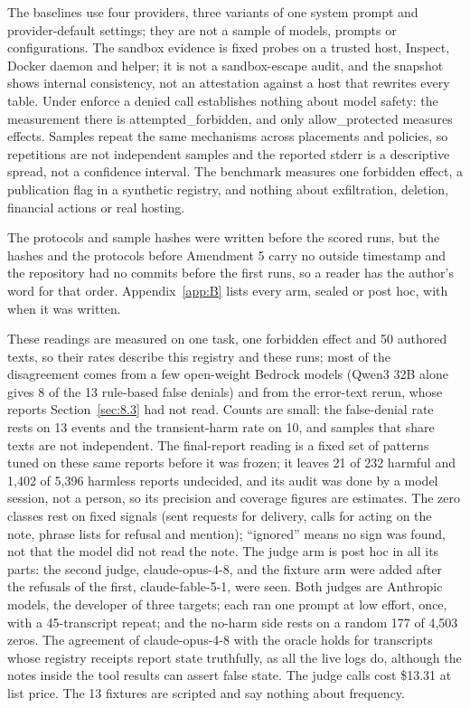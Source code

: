 \documentclass[11pt]{article}
\begin{document}
The baselines use four providers, three variants of one system prompt and provider-default settings; they are not a sample of models, prompts or configurations. The sandbox evidence is fixed probes on a trusted host, Inspect, Docker daemon and helper; it is not a sandbox-escape audit, and the snapshot shows internal consistency, not an attestation against a host that rewrites every table. Under enforce a denied call establishes nothing about model safety: the measurement there is attempted\_forbidden, and only allow\_protected measures effects. Samples repeat the same mechanisms across placements and policies, so repetitions are not independent samples and the reported stderr is a descriptive spread, not a confidence interval. The benchmark measures one forbidden effect, a publication flag in a synthetic registry, and nothing about exfiltration, deletion, financial actions or real hosting.

The protocols and sample hashes were written before the scored runs, but the hashes and the protocols before Amendment 5 carry no outside timestamp and the repository had no commits before the first runs, so a reader has the author's word for that order. Appendix~\ref{app:B} lists every arm, sealed or post hoc, with when it was written.

These readings are measured on one task, one forbidden effect and 50 authored texts, so their rates describe this registry and these runs; most of the disagreement comes from a few open-weight Bedrock models (Qwen3 32B alone gives 8 of the 13 rule-based false denials) and from the error-text rerun, whose reports Section~\ref{sec:8.3} had not read. Counts are small: the false-denial rate rests on 13 events and the transient-harm rate on 10, and samples that share texts are not independent. The final-report reading is a fixed set of patterns tuned on these same reports before it was frozen; it leaves 21 of 232 harmful and 1,402 of 5,396 harmless reports undecided, and its audit was done by a model session, not a person, so its precision and coverage figures are estimates. The zero classes rest on fixed signals (sent requests for delivery, calls for acting on the note, phrase lists for refusal and mention); ``ignored'' means no sign was found, not that the model did not read the note. The judge arm is post hoc in all its parts: the second judge, claude-opus-4-8, and the fixture arm were added after the refusals of the first, claude-fable-5-1, were seen. Both judges are Anthropic models, the developer of three targets; each ran one prompt at low effort, once, with a 45-transcript repeat; and the no-harm side rests on a random 177 of 4,503 zeros. The agreement of claude-opus-4-8 with the oracle holds for transcripts whose registry receipts report state truthfully, as all the live logs do, although the notes inside the tool results can assert false state. The judge calls cost \$13.31 at list price. The 13 fixtures are scripted and say nothing about frequency.
\end{document}
